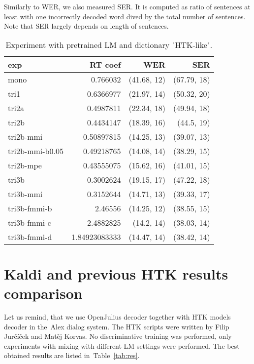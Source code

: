 Similarly to \ac{WER}, we also measured \ac{SER}. It is computed as ratio of sentences at least with one incorrectly decoded word dived by the total number of sentences. Note that \ac{SER} largely depends on length of sentences. 

\begin{table}[!htp]\label{tab:htk_like}\centering\begin{tabular}{l|rrr}
exp             & RT coef       & WER         & SER        \\ 
\hline
mono            & 0.766032      & (41.68, 12) & (67.79, 18)\\ 
tri1            & 0.6366977     & (21.97, 14) & (50.32, 20)\\ 
tri2a           & 0.4987811     & (22.34, 18) & (49.94, 18)\\ 
tri2b           & 0.4434147     & (18.39, 16) & (44.5, 19) \\ 
tri2b-mmi       & 0.50897815    & (14.25, 13) & (39.07, 13)\\ 
tri2b-mmi-b0.05 & 0.49218765    & (14.08, 14) & (38.29, 15)\\ 
tri2b-mpe       & 0.43555075    & (15.62, 16) & (41.01, 15)\\ 
tri3b           & 0.3002624     & (19.15, 17) & (47.22, 18)\\ 
tri3b-mmi       & 0.3152644     & (14.71, 13) & (39.33, 17)\\ 
tri3b-fmmi-b    & 2.46556       & (14.25, 12) & (38.55, 15)\\ 
tri3b-fmmi-c    & 2.4882825     & (14.2, 14)  & (38.03, 14)\\ 
tri3b-fmmi-d    & 1.84923083333 & (14.47, 14) & (38.42, 14)
\end{tabular}
\caption{Experiment with pretrained LM and dictionary "\ac{HTK}-like".}
\end{table}  


\section[Kaldi and \acs{HTK} comparison]{Kaldi and previous \ac{HTK} results comparison} 
\label{sec:compare}

Let us remind, that we use OpenJulius decoder together with HTK models decoder in the~Alex dialog system.
The \ac{HTK} scripts were written by Filip Jurčíček and Matěj Korvas. No discriminative training was performed,
only experiments with mixing with different \acl{LM} settings were performed. 
The best obtained results are listed in~Table~\ref{tab:res}.

